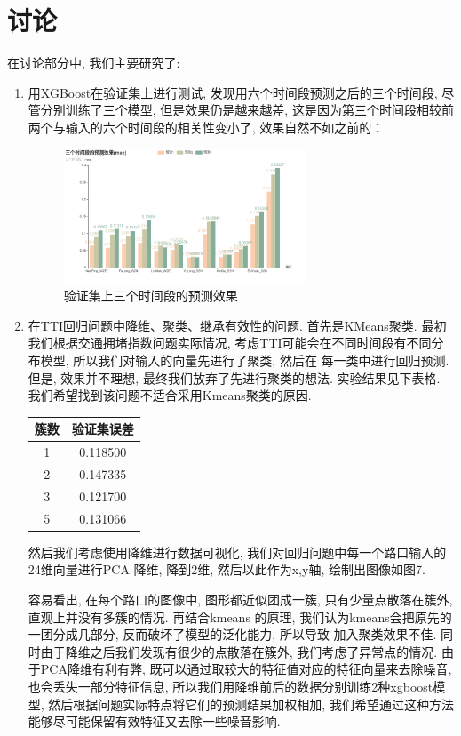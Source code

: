 \documentclass[a4paper,UTF8]{article}
\begin{document}
\section{讨论}
在讨论部分中, 我们主要研究了:
\begin{enumerate}
  \item 用XGBoost在验证集上进行测试, 发现用六个时间段预测之后的三个时间段, 尽管分别训练了三个模型, 但是效果仍是越来越差, 这是因为第三个时间段相较前两个与输入的六个时间段的相关性变小了, 效果自然不如之前的：
      \begin{figure}[!htbp]
        \centering
        \includegraphics[height=4cm]{bar2.png}
        \caption{验证集上三个时间段的预测效果}
      \end{figure}
  \item 在TTI回归问题中降维、聚类、继承有效性的问题. 首先是KMeans聚类. 最初我们根据交通拥堵指数问题实际情况, 考虑TTI可能会在不同时间段有不同分布模型, 所以我们对输入的向量先进行了聚类, 然后在 每一类中进行回归预测. 但是, 效果并不理想, 最终我们放弃了先进行聚类的想法. 实验结果见下表格. 我们希望找到该问题不适合采用Kmeans聚类的原因. 
      \begin{table}[!htbp]
      \centering
        \begin{tabular}{|c|c|}
          \hline
          簇数 & 验证集误差\\
          \hline
          1 & 0.118500\\
          \hline
          2 & 0.147335\\
          \hline
          3 & 0.121700\\
          \hline
          5 & 0.131066\\
          \hline
        \end{tabular}
      \end{table}

      然后我们考虑使用降维进行数据可视化, 我们对回归问题中每一个路口输入的24维向量进行PCA
      降维, 降到2维, 然后以此作为x,y轴, 绘制出图像如图7. 
      
      容易看出, 在每个路口的图像中, 图形都近似团成一簇, 只有少量点散落在簇外, 直观上并没有多簇的情况. 再结合kmeans
      的原理, 我们认为kmeans会把原先的一团分成几部分, 反而破坏了模型的泛化能力, 所以导致
      加入聚类效果不佳. 同时由于降维之后我们发现有很少的点散落在簇外, 我们考虑了异常点的情况. 由于PCA降维有利有弊, 既可以通过取较大的特征值对应的特征向量来去除噪音, 也会丢失一部分特征信息, 所以我们用降维前后的数据分别训练2种xgboost模型, 然后根据问题实际特点将它们的预测结果加权相加, 我们希望通过这种方法能够尽可能保留有效特征又去除一些噪音影响. 


\end{enumerate}
\end{document}

